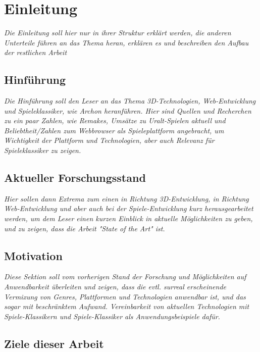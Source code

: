 \chapter{Einleitung}
\label{cha:Einleitung}

\emph{Die Einleitung soll hier nur in ihrer Struktur erkl\"art werden, die anderen Unterteile f\"uhren an das Thema heran, erkl\"aren es und beschreiben den Aufbau der restlichen Arbeit}

\section{Hinführung}
\label{sec:hinfuhrung}

\emph{Die Hinf\"uhrung soll den Leser an das Thema 3D-Technologien, Web-Entwicklung und Spieleklassiker, wie Archon heranführen. Hier sind Quellen und Recherchen zu ein paar Zahlen, wie Remakes, Umsätze zu Uralt-Spielen aktuell und Beliebtheit/Zahlen zum Webbrowser als Spieleplattform angebracht, um Wichtigkeit der Plattform und Technologien, aber auch Relevanz für Spieleklassiker zu zeigen.}

\section{Aktueller Forschungsstand}
\label{sec:aktueller_forschungsstand}

\emph{Hier sollen dann Extrema zum einen in Richtung 3D-Entwicklung, in Richtung Web-Entwicklung und aber auch bei der Spiele-Entwicklung kurz herausgearbeitet werden, um dem Leser einen kurzen Einblick in aktuelle M\"oglichkeiten zu geben, und zu zeigen, dass die Arbeit "State of the Art" ist.}

\section{Motivation}
\label{sec:motivation}
\emph{ Diese Sektion soll vom vorherigen Stand der Forschung und Möglichkeiten auf Anwendbarkeit überleiten und zeigen, dass die evtl. surreal erscheinende Vermixung von Genres, Plattformen und Technologien anwendbar ist, und das sogar mit beschränktem Aufwand. Vereinbarkeit von aktuellen Technologien mit Spiele-Klassikern und Spiele-Klassiker als Anwendungsbeispiele dafür.}

\section{Ziele dieser Arbeit}
\label{sec:ziele_dieser_arbeit}

